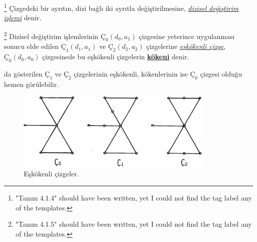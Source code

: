 \documentclass[11pt]{amsbook}
\begin{document}

\footnote{"Tanım 4.1.4" should have been written, yet I could not find the tag label any of the templates.} Çizgedeki bir ayrıtın, dizi bağlı iki ayrıtla değiştirilmesine, \textit{\underline{dizisel değiştirim işlemi}} denir.

\footnote{"Tanım 4.1.5" should have been written, yet I could not find the tag label any of the templates.} Dizisel değiştirim işlemlerinin $Ç_{0}(d_{0},a_{1})$ çizgesine yeterince uygulanması sonucu elde edilen $Ç_{1}(d_{1},a_{1})$ ve $Ç_{2}(d_{2},a_{2})$ çizgelerine \textit{\underline{eşkökenli çizge}}, $Ç_{0}(d_{0},a_{0})$ çizgesinede bu eşkökenli çizgelerin \textbf{\underline{kökeni}} denir.


 da gösterilen $Ç_{1}$ ve $Ç_{2}$ çizgelerinin eşkökenli, kökenlerinin ise $Ç_{0}$ çizgesi olduğu hemen görülebilir.

\begin{figure}[htb]
	\centering
	\includegraphics[width=0.85\textwidth]{images/ceyhun-188-fig01.png}
	\caption{Eşkökenli çizgeler.}
	\label{fig:Figure4.1.6}
\end{figure}
\end{document}
